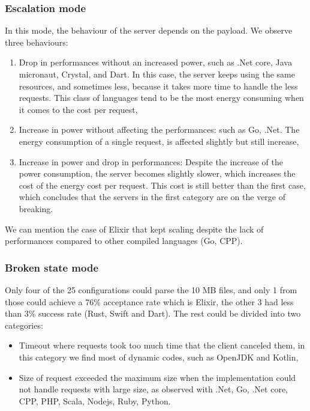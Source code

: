 \subsubsection{Escalation mode}
In this mode, the behaviour of the server depends on the payload. We observe three behaviours:
\begin{enumerate}
    \item Drop in performances without an increased power, such as .Net core, Java micronaut, Crystal, and Dart.
    In this case, the server keeps using the same resources, and sometimes less, because it takes more time to handle the less requests.
    This class of languages tend to be the most energy consuming when it comes to the cost per request,
    \item Increase in power without affecting the performances: such as Go, .Net.
    The energy consumption of a single request, is affected slightly but still increase,
    \item Increase in power and drop in performances: Despite the increase of the power consumption, the server becomes slightly slower, which increases the cost of the energy cost per request.
    This cost is still better than the first case, which concludes that the servers in the first category are on the verge of breaking.
\end{enumerate}

We can mention the case of Elixir that kept scaling despite the lack of performances compared to other compiled languages (Go, CPP).

\subsubsection{Broken state mode }
Only four of the 25 configurations could parse the 10 MB files, and only 1 from those could achieve a 76\% acceptance rate which is Elixir, the other 3 had less than 3\% success rate (Rust, Swift and Dart).
The rest could be divided into two categories:
\begin{itemize}
    \item \textsf{Timeout} where requests took too much time that the client canceled them, in this category we find most of dynamic codes, such as OpenJDK and Kotlin,
    \item \textsf{Size of request} exceeded the maximum size when the implementation could not handle requests with large size, as observed with .Net, Go, .Net core, CPP, PHP, Scala, Nodejs, Ruby, Python.
\end{itemize}


